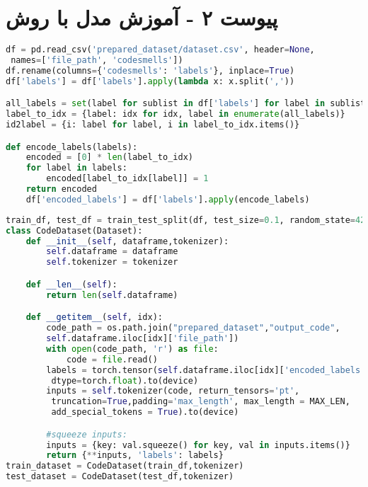 \chapter*{پیوست ۲ - آموزش مدل با روش }

\begin{latin}
    \begin{lstlisting}[language=Python, title=\rl{بارگذاری داده ها و ایجاد لیبل ها بصورت \lr{one hot}}]
df = pd.read_csv('prepared_dataset/dataset.csv', header=None,
 names=['file_path', 'codesmells'])
df.rename(columns={'codesmells': 'labels'}, inplace=True)
df['labels'] = df['labels'].apply(lambda x: x.split(','))

all_labels = set(label for sublist in df['labels'] for label in sublist)
label_to_idx = {label: idx for idx, label in enumerate(all_labels)}
id2label = {i: label for label, i in label_to_idx.items()}

def encode_labels(labels):
    encoded = [0] * len(label_to_idx)
    for label in labels:
        encoded[label_to_idx[label]] = 1
    return encoded
	df['encoded_labels'] = df['labels'].apply(encode_labels)
\end{lstlisting}
\end{latin}

\begin{latin}
    \begin{lstlisting}[language=Python, title=\rl{جدا کردن داده های آزمون و آموزش و ساخت دیتاست}]
train_df, test_df = train_test_split(df, test_size=0.1, random_state=42, shuffle=True)
class CodeDataset(Dataset):
    def __init__(self, dataframe,tokenizer):
        self.dataframe = dataframe
        self.tokenizer = tokenizer

    def __len__(self):
        return len(self.dataframe)

    def __getitem__(self, idx):
        code_path = os.path.join("prepared_dataset","output_code",
		self.dataframe.iloc[idx]['file_path'])
        with open(code_path, 'r') as file:
            code = file.read()
        labels = torch.tensor(self.dataframe.iloc[idx]['encoded_labels'],
		 dtype=torch.float).to(device)
        inputs = self.tokenizer(code, return_tensors='pt',
		 truncation=True,padding='max_length', max_length = MAX_LEN,
		 add_special_tokens = True).to(device)

        #squeeze inputs:
        inputs = {key: val.squeeze() for key, val in inputs.items()}
        return {**inputs, 'labels': labels}
train_dataset = CodeDataset(train_df,tokenizer)
test_dataset = CodeDataset(test_df,tokenizer)
\end{lstlisting}
\end{latin}

